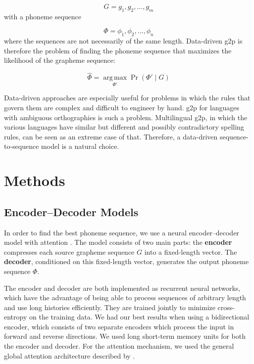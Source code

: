 \documentclass[11pt,letterpaper]{article}
\begin{document}
\begin{equation*}
G = g_1,g_2,...,g_m
\end{equation*}
with a phoneme sequence

\begin{equation*}
\Phi = \phi_1,\phi_2,...,\phi_n
\end{equation*}
where the sequences are not necessarily of the same length. Data-driven g2p is therefore the problem of finding the phoneme sequence that maximizes the likelihood of the grapheme sequence:

\begin{equation*}
\hat{\Phi} = \underset{\Phi'}{\operatorname{arg\,max}} \Pr(\Phi' \mid G)
\end{equation*}

Data-driven approaches are especially useful for problems in which the rules that govern them are complex and difficult to engineer by hand. g2p for languages with ambiguous orthographies is such a problem. Multilingual g2p, in which the various languages have similar but different and possibly contradictory spelling rules, can be seen as an extreme case of that. Therefore, a data-driven sequence-to-sequence model is a natural choice.

\section{Methods}
\subsection{Encoder--Decoder Models}
In order to find the best phoneme sequence, we use a neural encoder--decoder model with attention \cite{DBLP:journals/corr/BahdanauCB14}. The model consists of two main parts:
the \textbf{encoder} compresses each source grapheme sequence $G$ into a fixed-length vector. The \textbf{decoder}, conditioned on this fixed-length vector, generates the output phoneme sequence $\Phi$.

The encoder and decoder are both implemented as recurrent neural networks, which have the advantage of being able to process sequences of arbitrary length and use long histories efficiently. They are trained jointly to minimize cross-entropy on the training data. We had our best results when using a bidirectional encoder, which consists of two separate encoders which process the input in forward and reverse directions. We used long short-term memory units \cite{hochreiter1997long} for both the encoder and decoder. For the attention mechanism, we used the general global attention architecture described by .
\end{document}
